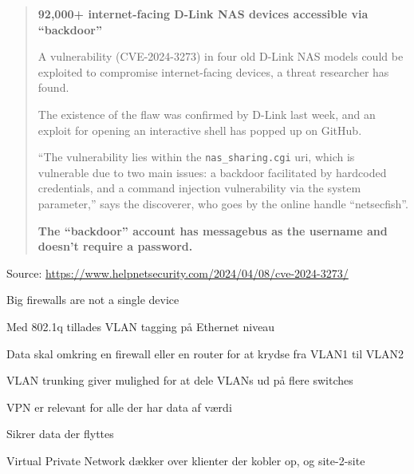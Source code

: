\documentclass[Screen16to9,17pt]{foils}
\begin{document}
\begin{quote}{\large\bf
92,000+ internet-facing D-Link NAS devices accessible via “backdoor”}

A vulnerability (CVE-2024-3273) in four old D-Link NAS models could be exploited to compromise internet-facing devices, a threat researcher has found.

The existence of the flaw was confirmed by D-Link last week, and an exploit for opening an interactive shell has popped up on GitHub.

“The vulnerability lies within the \verb+nas_sharing.cgi+ uri, which is vulnerable due to two main issues: a backdoor facilitated by hardcoded credentials, and a command injection vulnerability via the system parameter,” says the discoverer, who goes by the online handle “netsecfish”.

{\bf The “backdoor” account has messagebus as the username and doesn’t require a password.}
\end{quote}
Source: \url{https://www.helpnetsecurity.com/2024/04/08/cve-2024-3273/}





\centerline{Big firewalls are not a single device}





\begin{list1}
\item Med 802.1q tillades VLAN tagging på Ethernet niveau
\item Data skal omkring en firewall eller en router for at krydse fra VLAN1 til VLAN2
\item VLAN trunking giver mulighed for at dele VLANs ud på flere switches
\end{list1}




\begin{list2}
\item VPN er relevant for alle der har data af værdi
\item Sikrer data der flyttes
\item Virtual Private Network dækker over klienter der kobler op, og site-2-site
\end{list2}
\end{document}
